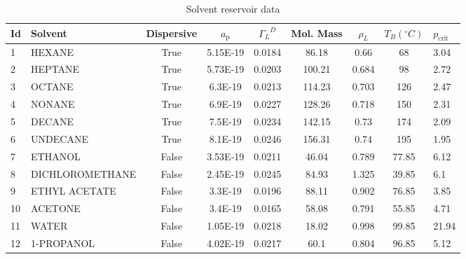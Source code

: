 \begin{table}[htb]
 \begin{tabular}{l l c c c c c c l}
 \toprule
  Id & Solvent  & Dispersive  & $a_\mathrm{p}$ & ${\Gamma_L}^D$ & Mol. Mass  & $\rho_L$ & $T_B (^\circ C)$ & $p_\mathrm{crit}$ \\
  \midrule
  1 & HEXANE & True & 5.15E-19 & 0.0184 & 86.18 & 0.66 & 68 & 3.04\\
  2 & HEPTANE & True & 5.73E-19 & 0.0203 & 100.21 & 0.684 & 98 & 2.72\\
  3 & OCTANE & True & 6.3E-19 & 0.0213 & 114.23 & 0.703 & 126 & 2.47\\
  4 & NONANE & True & 6.9E-19 & 0.0227 & 128.26 & 0.718 & 150 & 2.31\\
  5 & DECANE & True & 7.5E-19 & 0.0234 & 142.15 & 0.73 & 174 & 2.09\\
  6 & UNDECANE & True & 8.1E-19 & 0.0246 & 156.31 & 0.74 & 195 & 1.95\\
  7 & ETHANOL & False & 3.53E-19 & 0.0211 & 46.04 & 0.789 & 77.85 & 6.12\\
  8 & DICHLOROMETHANE & False & 2.45E-19 & 0.0245 & 84.93 & 1.325 & 39.85 & 6.1\\
  9 & ETHYL ACETATE & False & 3.3E-19 & 0.0196 & 88.11 & 0.902 & 76.85 & 3.85\\
  10 & ACETONE & False & 3.4E-19 & 0.0165 & 58.08 & 0.791 & 55.85 & 4.71\\
  11 & WATER & False & 1.05E-19 & 0.0218 & 18.02 & 0.998 & 99.85 & 21.94\\
  12 & 1-PROPANOL & False & 4.02E-19 & 0.0217 & 60.1 & 0.804 & 96.85 & 5.12\\
  \bottomrule
 \end{tabular}
\caption{Solvent reservoir data}
\end{table}
